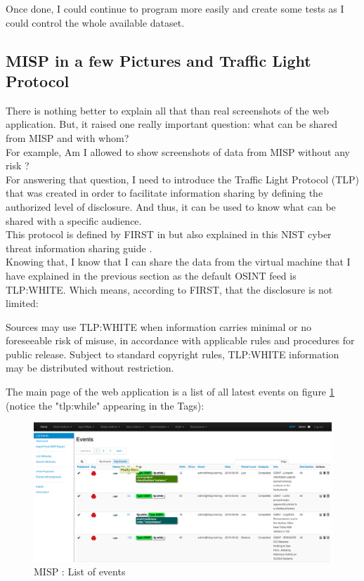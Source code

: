 \documentclass{eplmastersthesis}
\begin{document}
Once done, I could continue to program more easily and create some tests as I could control the whole available dataset.\\

\subsection{MISP in a few Pictures and Traffic Light Protocol}
There is nothing better to explain all that than real screenshots of the web application. But, it raised one really important question: what can be shared from MISP and with whom?\\
For example, Am I allowed to show screenshots of data from MISP without any risk ?\\
For answering that question, I need to introduce the Traffic Light Protocol (TLP) that was created in order to facilitate information sharing by defining the authorized level of disclosure. And thus, it can be used to know what can be shared with a specific audience.\\
This protocol is defined by FIRST in \cite{FirstTLP} but also explained in this NIST cyber threat information sharing guide \cite{johnson2016guide}.\\

Knowing that, I know that I can share the data from the virtual machine that I have explained in the previous section as the default OSINT feed is TLP:WHITE. Which means, according to FIRST, that the disclosure is not limited: \\

\begin{boxedverbatim}
	Sources may use TLP:WHITE when information carries minimal or no foreseeable 
	risk of misuse, in accordance with applicable rules and procedures for public 
	release. Subject to standard copyright rules, TLP:WHITE information may be 
	distributed without restriction.
\end{boxedverbatim}

The main page of the web application is a list of all latest events on figure \ref{webevents} (notice the "tlp:while" appearing in the Tags):

\begin{figure}[!h]
	\begin{center}
		\includegraphics[scale=0.32]{res/webEvents}
		\caption{MISP : List of events}
		\label{webevents}
	\end{center}
\end{figure}
\end{document}
